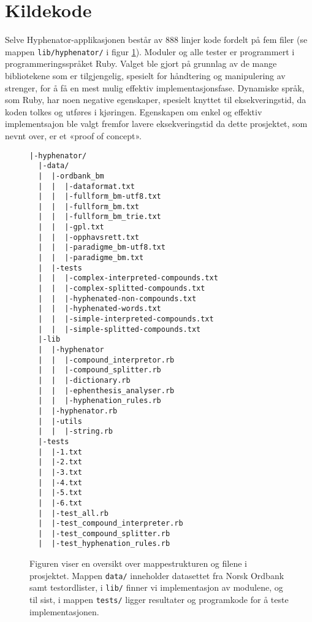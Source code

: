 \section{Kildekode}
\label{sec:kildekode}

Selve Hyphenator-applikasjonen består av 888 linjer kode fordelt på fem filer (se mappen \texttt{lib/hyphenator/} i figur \ref{fig:source-code}). Moduler og alle tester er programmert i programmeringsspråket Ruby. Valget ble gjort på grunnlag av de mange bibliotekene som er tilgjengelig, spesielt for håndtering og manipulering av strenger, for å få en mest mulig effektiv implementasjonsfase. Dynamiske språk, som Ruby, har noen negative egenskaper, spesielt knyttet til eksekveringstid, da koden tolkes og utføres i kjøringen. Egenskapen om enkel og effektiv implementsajon ble valgt fremfor lavere eksekveringstid da dette prosjektet, som nevnt over, er et «proof of concept».

\begin{figure}
\begin{verbatim}
|-hyphenator/
  |-data/
  |  |-ordbank_bm
  |  |  |-dataformat.txt
  |  |  |-fullform_bm-utf8.txt
  |  |  |-fullform_bm.txt
  |  |  |-fullform_bm_trie.txt
  |  |  |-gpl.txt
  |  |  |-opphavsrett.txt
  |  |  |-paradigme_bm-utf8.txt
  |  |  |-paradigme_bm.txt
  |  |-tests
  |  |  |-complex-interpreted-compounds.txt
  |  |  |-complex-splitted-compounds.txt
  |  |  |-hyphenated-non-compounds.txt
  |  |  |-hyphenated-words.txt
  |  |  |-simple-interpreted-compounds.txt
  |  |  |-simple-splitted-compounds.txt
  |-lib
  |  |-hyphenator
  |  |  |-compound_interpretor.rb
  |  |  |-compound_splitter.rb
  |  |  |-dictionary.rb
  |  |  |-ephenthesis_analyser.rb
  |  |  |-hyphenation_rules.rb
  |  |-hyphenator.rb
  |  |-utils
  |  |  |-string.rb
  |-tests
  |  |-1.txt
  |  |-2.txt
  |  |-3.txt
  |  |-4.txt
  |  |-5.txt
  |  |-6.txt
  |  |-test_all.rb
  |  |-test_compound_interpreter.rb
  |  |-test_compound_splitter.rb
  |  |-test_hyphenation_rules.rb
\end{verbatim}
\caption[Filstrukturen i Hyphenator-prosjektet]{Figuren viser en oversikt over mappestrukturen og filene i prosjektet. Mappen \texttt{data/} inneholder datasettet fra Norsk Ordbank samt testordlister, i \texttt{lib/} finner vi implementasjon av modulene, og til sist, i mappen \texttt{tests/} ligger resultater og programkode for å teste implementasjonen.}
\label{fig:source-code}
\end{figure}